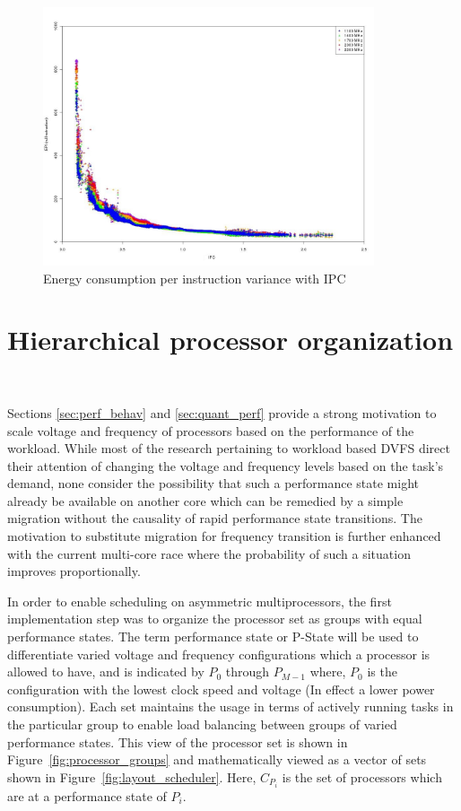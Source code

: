 \begin{figure}[h!]
  \begin{center}
    \includegraphics[height=3in]{figures/ipc_epi.jpg}%
    \caption{Energy consumption per instruction variance with IPC}
    \label{fig:ipc_epi}
  \end{center}
\end{figure}

\section{Hierarchical processor organization}~\label{sec:proc_org}

Sections \ref{sec:perf_behav} and \ref{sec:quant_perf}  provide a strong motivation to
scale voltage and frequency of processors based on the performance of the workload.
While most of the research pertaining to workload based DVFS direct their attention of changing the voltage and frequency levels
based on the task's demand, none consider the possibility that such a performance state might
already be available on another core which can be remedied by a simple migration without the 
causality of rapid performance state transitions. The motivation to substitute migration for
frequency transition is further enhanced with the current multi-core race where the probability
of such a situation improves proportionally.  

In order to enable scheduling on asymmetric multiprocessors, the first implementation
step was to organize the processor set as groups with equal performance states. 
The term performance state or P-State will be used to differentiate varied voltage and
frequency configurations which a processor is allowed to have, and is indicated by
$P_{0}$ through $P_{M-1}$ where, $P_0$ is the configuration with the lowest clock speed
and voltage (In effect a lower power consumption). Each set maintains the usage in terms
of actively running tasks in the particular group to enable load balancing between 
groups of varied performance states. This view of the processor set is shown in
Figure~\ref{fig:processor_groups} and mathematically viewed as a vector of sets shown in Figure~\ref{fig:layout_scheduler}.
Here, $C_{P_{i}}$ is the set of processors which are at 
a performance state of $P_{i}$.


